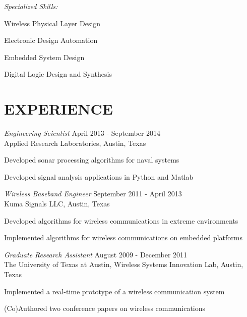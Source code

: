 \documentclass[line,margin=1in]{res}
\begin{document}
\begin{resume}
  \vspace*{-1.5\baselineskip}

  {\sl Specialized Skills:}
  \vspace*{-0.75\baselineskip}
  \begin{multicols}{2}
    \begin{compactitem}
      \item{Wireless Physical Layer Design}
      \item{Electronic Design Automation}
      \item{Embedded System Design}
      \item{Digital Logic Design and Synthesis}
    \end{compactitem}
  \end{multicols}

\section{EXPERIENCE} 

{\sl Engineering Scientist} \hfill April 2013 - September 2014 \\
Applied Research Laboratories, Austin, Texas
\begin{compactitem}
  \item Developed sonar processing algorithms for naval systems
  \item Developed signal analysis applications in Python and Matlab
\end{compactitem}

{\sl Wireless Baseband Engineer} \hfill September 2011 - April 2013 \\
Kuma Signals LLC, Austin, Texas
\begin{compactitem}  
  \item Developed algorithms for wireless communications in extreme environments
  \item Implemented algorithms for wireless communications on embedded platforms
\end{compactitem}

{\sl Graduate Research Assistant} \hfill August 2009 - December 2011 \\
The University of Texas at Austin, Wireless Systems Innovation Lab, Austin, Texas
\begin{compactitem}  
  \item Implemented a real-time prototype of a wireless communication system~\cite{massey2012implementation}
  \item (Co)Authored two conference papers on wireless communications~\cite{starr2011interference,massey2012implementation}
\end{compactitem}


\end{resume}
\end{document}
